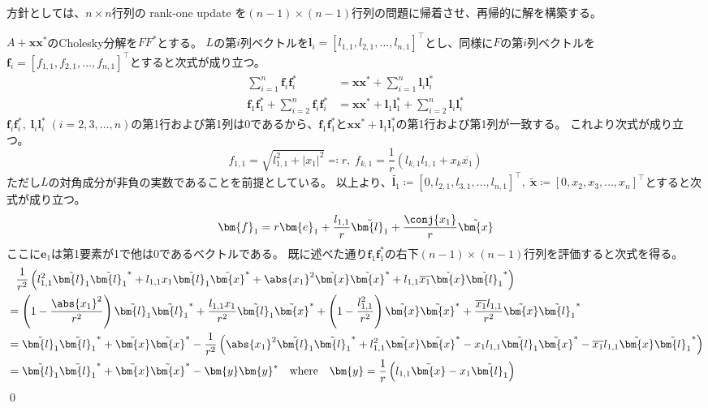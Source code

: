         \begin{derivation*}
            方針としては、$n\times n$行列の rank-one update を$(n-1)\times(n-1)$行列の問題に帰着させ、再帰的に解を構築する。
            \par
            $A+\bm{x}\bm{x}^*$のCholesky分解を$FF^*$とする。
            $L$の第$i$列ベクトルを$\bm{l}_i = [l_{1,1},l_{2,1},\dots,l_{n,1}]^\top$とし、同様に$F$の第$i$列ベクトルを$\bm{f}_i = [f_{1,1},f_{2,1},\dots,f_{n,1}]^\top$とすると次式が成り立つ。
            \begin{align*}
                \sum_{i=1}^n \bm{f}_i\bm{f}_i^* &= \bm{x}\bm{x}^* + \sum_{i=1}^n \bm{l}_i\bm{l}_i^* \\
                \bm{f}_1\bm{f}_1^* + \sum_{i=2}^n \bm{f}_i\bm{f}_i^* &= \bm{x}\bm{x}^* + \bm{l}_1\bm{l}_1^* + \sum_{i=2}^n \bm{l}_i\bm{l}_i^*
            \end{align*}
            $\bm{f}_i\bm{f}_i^*,\;\bm{l}_i\bm{l}_i^*\;(i=2,3,\dots,n)$の第1行および第1列は0であるから、$\bm{f}_1\bm{f}_1^*$と$\bm{x}\bm{x}^* + \bm{l}_1\bm{l}_1^*$の第1行および第1列が一致する。
            これより次式が成り立つ。
            \[ f_{1,1} = \sqrt{l_{1,1}^2 + |x_1|^2} \eqqcolon r,\; f_{k,1} = \frac{1}{r}\left(l_{k,1}l_{1,1} + x_k\overline{x_1}\right)\]
            ただし$L$の対角成分が非負の実数であることを前提としている。
            以上より、$\tilde{\bm{l}_1} \coloneqq [0,l_{2,1},l_{3,1},\dots,l_{n,1}]^\top,\;\tilde{\bm{x}} \coloneqq [0,x_2,x_3,\dots,x_n]^\top$とすると次式が成り立つ。
            \[ \bm{f}_1 = r\bm{e}_1 + \frac{l_{1,1}}{r}\tilde{\bm{l}_1} + \frac{\conj{x_1}}{r}\tilde{\bm{x}} \]
            ここに$\bm{e}_1$は第1要素が1で他は0であるベクトルである。
            既に述べた通り$\bm{f}_1\bm{f}_1^*$の右下$(n-1)\times(n-1)$行列を評価すると次式を得る。
            \begin{align*}
                &\phantom{=} \frac{1}{r^2} \left(l_{1,1}^2\tilde{\bm{l}_1}\tilde{\bm{l}_1}^* + l_{1,1}x_1\tilde{\bm{l}_1}\tilde{\bm{x}}^* + \abs{x_1}^2\tilde{\bm{x}}\tilde{\bm{x}}^* + l_{1,1}\overline{x_1}\tilde{\bm{x}}\tilde{\bm{l}_1}^*\right) \\
                &= \left(1 - \frac{\abs{x_1}^2}{r^2}\right)\tilde{\bm{l}_1}\tilde{\bm{l}_1}^* + \frac{l_{1,1}x_1}{r^2}\tilde{\bm{l}_1}\tilde{\bm{x}}^* + \left(1 - \frac{l_{1,1}^2}{r^2}\right)\tilde{\bm{x}}\tilde{\bm{x}}^* + \frac{\overline{x_1}l_{1,1}}{r^2}\tilde{\bm{x}}\tilde{\bm{l}_1}^* \\
                &= \tilde{\bm{l}_1}\tilde{\bm{l}_1}^* + \tilde{\bm{x}}\tilde{\bm{x}}^* - \frac{1}{r^2}\left(\abs{x_1}^2\tilde{\bm{l}_1}\tilde{\bm{l}_1}^* + l_{1,1}^2\tilde{\bm{x}}\tilde{\bm{x}}^* - x_1l_{1,1}\tilde{\bm{l}_1}\tilde{\bm{x}}^* - \overline{x_1}l_{1,1}\tilde{\bm{x}}\tilde{\bm{l}_1}^*\right) \\
                &= \tilde{\bm{l}_1}\tilde{\bm{l}_1}^* + \tilde{\bm{x}}\tilde{\bm{x}}^* - \bm{y}\bm{y}^* \quad \text{where} \quad \bm{y} = \frac{1}{r}\left(l_{1,1}\tilde{\bm{x}} - x_1\tilde{\bm{l}_1}\right)
            \end{align*}
            \qed
        \end{derivation*}
